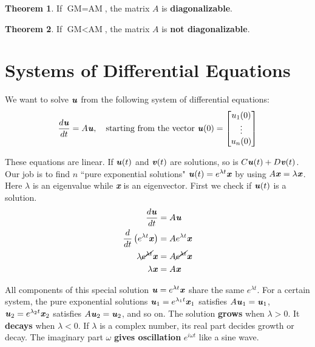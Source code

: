 \documentclass[12pt, letterpaper]{article}
\newcommand{\V}[1]{\textbf{\textit{#1}}}
\newcommand{\DefinitionSpace}{\vspace{15px}}
\theoremstyle{definition}
\newtheorem{theorem}{Theorem}
\begin{document}
	\DefinitionSpace
	\begin{theorem}
		If $\text{GM} = \text{AM}$, the matrix $A$ is \textbf{diagonalizable}.
	\end{theorem}
	\DefinitionSpace
	\begin{theorem}
		If $\text{GM} < \text{AM}$, the matrix $A$ is \textbf{not diagonalizable}.
	\end{theorem}
	

\section{Systems of Differential Equations}
We want to solve $\V{u}$ from the following system of differential equations:
	\begin{gather*}
		\frac{d\V{u}}{dt} = A \V{u}, \quad \text{starting from the vector $\V{u}(0) = \begin{bmatrix}u_1(0) \\ \vdots \\ u_n(0) \end{bmatrix}$}
	\end{gather*}

These equations are linear. If $\V{u}(t)$ and $\V{v}(t)$ are solutions, so is $C\V{u}(t) + D\V{v}(t)$. Our job is to find $n$ ``pure exponential solutions" $\V{u}(t) = e^{\lambda t}\V{x}$ by using $A\V{x} = \lambda \V{x}$. Here $\lambda$ is an eigenvalue while \V{x} is an eigenvector. First we check if $\V{u}(t)$ is a solution.
	\begin{align*}
		\frac{d\V{u}}{dt} &= A \V{u} \\
		\frac{d}{dt}\left( e^{\lambda t}\V{x} \right) &= Ae^{\lambda t}\V{x} \\
		\lambda \cancel{e^{\lambda t}} \V{x} &= A \cancel{e^{\lambda t}}\V{x} \\
		\lambda \V{x} &= A \V{x}
	\end{align*}
	
All components of this special solution $\V{u} = e^{\lambda t}\V{x}$ share the same $e^{\lambda t}$. For a certain system, the pure exponential solutions $\V{u}_1 = e^{\lambda_1 t}\V{x}_1$ satisfies $A\V{u}_1 = \V{u}_1$, $\V{u}_2 = e^{\lambda_2 t}\V{x}_2$ satisfies $A\V{u}_2 = \V{u}_2$, and so on. The solution \textbf{grows} when $\lambda>0$. It \textbf{decays} when $\lambda < 0$. If $\lambda$ is a complex number, its real part decides growth or decay. The imaginary part $\omega$ \textbf{gives oscillation} $e^{i \omega t}$ like a sine wave.
	
\end{document}
